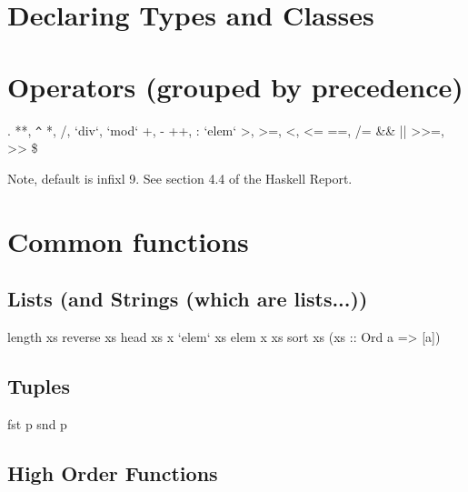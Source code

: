 \documentclass{refcard}
\begin{document}
\section{Declaring Types and Classes}


\section{Operators (grouped by precedence)}

\begin{Ldesc}
	\Li[9] .
	\Li[8] **, \verb+^+
	\Li[7] *, /, `div`, `mod`
	\Li[6] +, -
	\Li[5] ++, :
	\Li[4] `elem`
	\li[4] >, >=, <, <=
	\li[4] ==, /=
	\Li[3] \&\&
	\Li[2] ||
	\Li[1] >>=, >>
	\Li[0] \$
\end{Ldesc}

\noindent
Note, default is infixl 9.  See section 4.4 of the Haskell Report.


\section{Common functions}

\subsection{Lists {\small (and Strings {\tiny(which are lists...)})}}

\begin{ldesc}
	         length xs
	      reverse xs
	  head xs
	      x `elem` xs
	                                     elem x xs
	\li[sorts \C{xs}]                    sort xs
	\li                                  (xs :: Ord a => [a])
\end{ldesc}

\subsection{Tuples}

\begin{ldesc}
	             fst p
	            snd p
\end{ldesc}


\subsection{High Order Functions}
\end{document}
